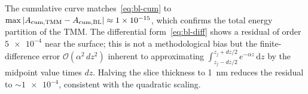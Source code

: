 The cumulative curve matches~\eqref{eq:bl-cum} to
$\max|A_{\rm cum,TMM} - A_{\rm cum,BL}| \approx \num{1e-15}$, which
confirms the total energy partition of the TMM. The differential
form~\eqref{eq:bl-diff} shows a residual of order $\num{5e-4}$ near the
surface; this is not a methodological bias but the finite-difference error
$\mathcal{O}(\alpha^{2}\,dz^{2})$ inherent to approximating
$\int_{z_j - dz/2}^{z_j + dz/2} e^{-\alpha z}\,\mathrm{d}z$ by the midpoint
value times $dz$. Halving the slice thickness to \SI{1}{\nano\metre}
reduces the residual to $\sim \num{1e-4}$, consistent with the quadratic
scaling.


